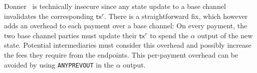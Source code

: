   Donner~\cite{donner} is technically insecure since any state update to a base
  channel invalidates the corresponding $\mathsf{tx}^r$. There is a
  straightforward fix, which however adds an overhead to each payment over
  a base channel: On every payment, the two base channel parties must update
  their $\mathsf{tx}^r$ to spend the $\alpha$ output of the new state. Potential
  intermediaries must consider this overhead and possibly increase the fees they
  require from the endpoints. This per-payment overhead can be avoided by using
  \texttt{ANYPREVOUT} in the $\alpha$ output.
